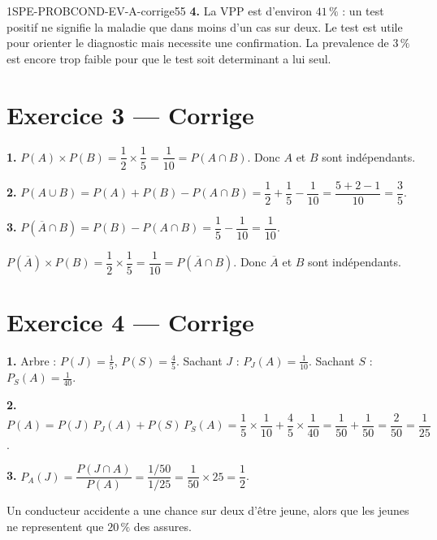 \begin{evaluation}{1SPE-PROBCOND-EV-A-corrige}{55}
\medskip
\textbf{4.} La VPP est d'environ $41\,\%$ : un test positif ne signifie la maladie que dans moins d'un cas sur deux. Le test est utile pour orienter le diagnostic mais necessite une confirmation. La prevalence de $3\,\%$ est encore trop faible pour que le test soit determinant a lui seul.

\section*{Exercice 3 --- Corrige}


\textbf{1.} $P(A) \times P(B) = \dfrac{1}{2} \times \dfrac{1}{5} = \dfrac{1}{10} = P(A \cap B)$. Donc $A$ et $B$ sont indépendants.

\medskip
\textbf{2.} $P(A \cup B) = P(A) + P(B) - P(A \cap B) = \dfrac{1}{2} + \dfrac{1}{5} - \dfrac{1}{10} = \dfrac{5+2-1}{10} = \dfrac{3}{5}$.

\medskip
\textbf{3.} $P(\overline{A} \cap B) = P(B) - P(A \cap B) = \dfrac{1}{5} - \dfrac{1}{10} = \dfrac{1}{10}$.

$P(\overline{A}) \times P(B) = \dfrac{1}{2} \times \dfrac{1}{5} = \dfrac{1}{10} = P(\overline{A} \cap B)$. Donc $\overline{A}$ et $B$ sont indépendants.

\section*{Exercice 4 --- Corrige}


\textbf{1.} Arbre : $P(J) = \frac{1}{5}$, $P(S) = \frac{4}{5}$. Sachant $J$ : $P_J(A) = \frac{1}{10}$. Sachant $S$ : $P_S(A) = \frac{1}{40}$.

\medskip
\textbf{2.} $P(A) = P(J)\,P_J(A) + P(S)\,P_S(A) = \dfrac{1}{5} \times \dfrac{1}{10} + \dfrac{4}{5} \times \dfrac{1}{40} = \dfrac{1}{50} + \dfrac{1}{50} = \dfrac{2}{50} = \dfrac{1}{25}$.

\medskip
\textbf{3.} $P_A(J) = \dfrac{P(J \cap A)}{P(A)} = \dfrac{1/50}{1/25} = \dfrac{1}{50} \times 25 = \dfrac{1}{2}$.

Un conducteur accidente a une chance sur deux d'être jeune, alors que les jeunes ne representent que $20\,\%$ des assures.

\end{evaluation}
